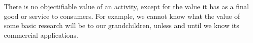 There is no objectifiable value of an activity, except for the value it has as a final good or service to consumers. For example, we cannot know what the value of some basic research will be to our grandchildren, unless and until we know its commercial applications.
